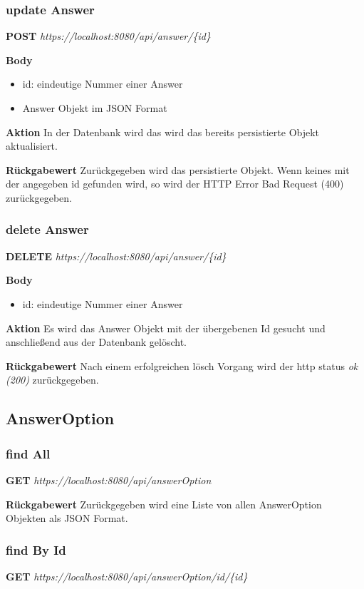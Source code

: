\subsubsection{update Answer}
\textbf{POST} \emph{https://localhost:8080/api/answer/\{id\}}

\textbf{Body}
\begin{itemize}
    \item id: eindeutige Nummer einer Answer
    \item Answer Objekt im JSON Format
\end{itemize}

\textbf{Aktion}
In der Datenbank wird das wird das bereits persistierte Objekt aktualisiert.

\textbf{Rückgabewert}
Zurückgegeben wird das persistierte Objekt. Wenn keines mit der angegeben id gefunden wird, so wird der HTTP Error Bad Request
(400) zurückgegeben.

\subsubsection{delete Answer}
\textbf{DELETE} \emph{https://localhost:8080/api/answer/\{id\}}

\textbf{Body}
\begin{itemize}
    \item id: eindeutige Nummer einer Answer
\end{itemize}

\textbf{Aktion}
Es wird das Answer Objekt mit der übergebenen Id gesucht und anschließend
aus der Datenbank gelöscht.

\textbf{Rückgabewert}
Nach einem erfolgreichen lösch Vorgang wird der http status \emph{ok (200)} zurückgegeben.

\subsection{AnswerOption}
\subsubsection{find All}
\textbf{GET} \emph{https://localhost:8080/api/answerOption}

\textbf{Rückgabewert}
Zurückgegeben wird eine Liste von allen AnswerOption Objekten als JSON
Format.

\subsubsection{find By Id}
\textbf{GET} \emph{https://localhost:8080/api/answerOption/id/\{id\}}

